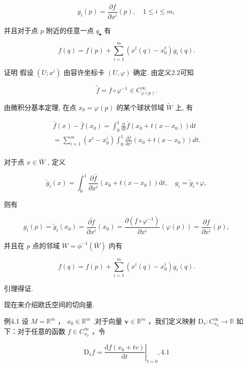 $$
g _ {i} (p) = \frac {\partial f}{\partial x ^ {i}} (p), \quad 1 \leqslant i \leqslant m,
$$

并且对于点  $p$  附近的任意一点  $q_{\bullet}$  有

$$
f (q) = f (p) + \sum_ {i = 1} ^ {m} \left(x ^ {t} (q) - x _ {0} ^ {t}\right) g _ {i} (q).
$$

证明 假设  $(U; x^i)$  由容许坐标卡  $(U, \varphi)$  确定. 由定义2.2可知

$$
\tilde {f} = f \circ \varphi^ {- 1} \in C _ {\varphi (p)} ^ {\infty}.
$$

由微积分基本定理, 在点  $x_0 = \varphi(p)$  的某个球状邻域  $\tilde{W}$  上, 有

$$
\begin{array}{l} \bar {f} (x) - \bar {f} (x _ {0}) = \int_ {0} ^ {1} \frac {\mathrm {d}}{\mathrm {d} t} \bar {f} (x _ {0} + t (x - x _ {0})) \mathrm {d} t \\ = \sum_ {i = 1} ^ {m} \left(x ^ {i} - x _ {0} ^ {i}\right) \int_ {0} ^ {1} \frac {\partial \bar {f}}{\partial x ^ {i}} \left(x _ {0} + t (x - x _ {0})\right) d t. \\ \end{array}
$$

对于点  $x \in \bar{W}$ , 定义

$$
\tilde {g} _ {i} (x) = \int_ {0} ^ {1} \frac {\partial \bar {f}}{\partial x ^ {i}} (x _ {0} + t (x - x _ {0})) \mathrm {d} t, \quad g _ {i} = \tilde {g} _ {i} \circ \varphi ,
$$

则有

$$
g _ {i} (p) = \tilde {g} _ {i} (x _ {0}) = \frac {\partial \tilde {f}}{\partial x ^ {i}} (x _ {0}) = \frac {\partial (f \circ \varphi^ {- 1})}{\partial x ^ {i}} (\varphi (p)) = \frac {\partial f}{\partial x ^ {i}} (p),
$$

并且在  $p$  点的邻域  $W = \phi^{-1}(\bar{W})$  内有

$$
f (q) = f (p) + \sum_ {i = 1} ^ {m} \left(x ^ {i} (q) - x _ {0} ^ {i}\right) g _ {i} (q).
$$

引理得证.

现在来介绍欧氏空间的切向量.

例4.1 设  $M = \mathbb{R}^m$  ，  $x_0\in \mathbb{R}^m$  .对于向量  $\pmb {v}\in \mathbb{R}^{m}$  ，我们定义映射 $\mathrm{D}_v:C_{x_0}^\infty \to \mathbb{R}$  如下：对于任意的函数  $f\in C_{x_0}^\infty$  ，令

$$
\mathrm {D} _ {v} f = \left. \frac {\mathrm {d} f \left(x _ {0} + t v\right)}{\mathrm {d} t} \right| _ {t = 0}, %
 {4.1}
$$


